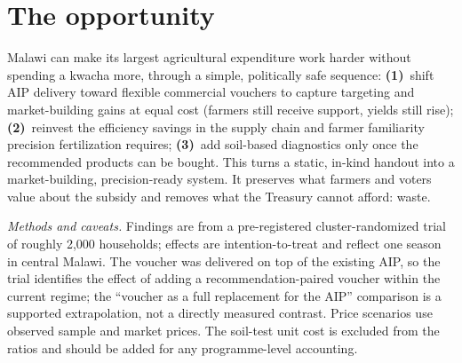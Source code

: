 \documentclass[10pt]{article}
\begin{document}
\section{The opportunity}
Malawi can make its largest agricultural expenditure work harder without spending a kwacha more, through a simple, politically safe sequence:
\textbf{(1)}~shift AIP delivery toward flexible commercial vouchers to capture targeting and market-building gains at equal cost (farmers still receive support, yields still rise);
\textbf{(2)}~reinvest the efficiency savings in the supply chain and farmer familiarity precision fertilization requires;
\textbf{(3)}~add soil-based diagnostics only once the recommended products can be bought. This turns a static, in-kind handout into a market-building, precision-ready system. It preserves what farmers and voters value about the subsidy and removes what the Treasury cannot afford: waste.

\vspace{4pt}
{\footnotesize\color{black!60}\textit{Methods and caveats.} Findings are from a pre-registered cluster-randomized trial of roughly 2{,}000 households; effects are intention-to-treat and reflect one season in central Malawi. The voucher was delivered on top of the existing AIP, so the trial identifies the effect of adding a recommendation-paired voucher within the current regime; the ``voucher as a full replacement for the AIP'' comparison is a supported extrapolation, not a directly measured contrast. Price scenarios use observed sample and market prices. The soil-test unit cost is excluded from the ratios and should be added for any programme-level accounting.}
\end{document}
